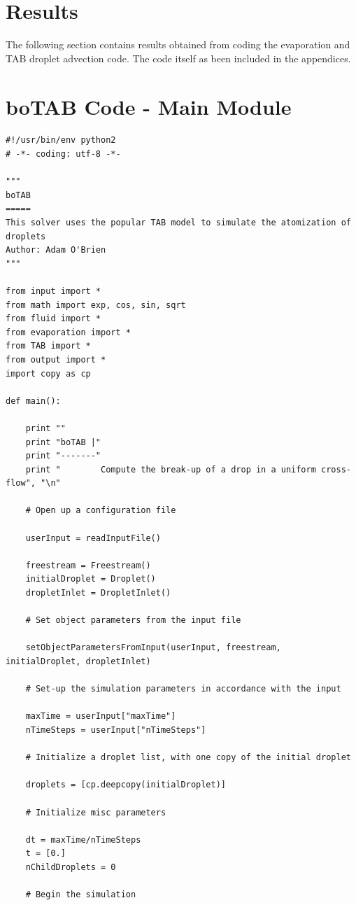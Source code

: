 \documentclass[12pt]{article}
\begin{document}
\section{Results}\label{sec:Results}

The following section contains results obtained from coding the evaporation and TAB droplet advection code. The code itself as been included in the appendices.

\newpage
\appendix
\section{boTAB Code - Main Module}

\begin{lstlisting}
#!/usr/bin/env python2
# -*- coding: utf-8 -*-

"""
boTAB
=====
This solver uses the popular TAB model to simulate the atomization of droplets
Author: Adam O'Brien
"""

from input import *
from math import exp, cos, sin, sqrt
from fluid import *
from evaporation import *
from TAB import *
from output import *
import copy as cp

def main():

    print ""
    print "boTAB |"
    print "-------"
    print "        Compute the break-up of a drop in a uniform cross-flow", "\n"

    # Open up a configuration file

    userInput = readInputFile()

    freestream = Freestream()
    initialDroplet = Droplet()
    dropletInlet = DropletInlet()

    # Set object parameters from the input file

    setObjectParametersFromInput(userInput, freestream, initialDroplet, dropletInlet)

    # Set-up the simulation parameters in accordance with the input

    maxTime = userInput["maxTime"]
    nTimeSteps = userInput["nTimeSteps"]

    # Initialize a droplet list, with one copy of the initial droplet

    droplets = [cp.deepcopy(initialDroplet)]

    # Initialize misc parameters

    dt = maxTime/nTimeSteps
    t = [0.]
    nChildDroplets = 0

    # Begin the simulation


\end{lstlisting}
\end{document}
